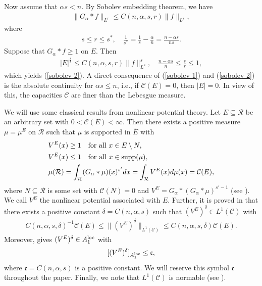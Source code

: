 \documentclass[10pt,reqno]{amsart}
\numberwithin{equation}{section}
\begin{document}
Now assume that $\alpha s<n$. By Sobolev embedding theorem, we have 
\begin{align*}
\|G_{\alpha}\ast f\|_{L^{r}}\leq C(n,\alpha,s,r)\|f\|_{L^{s}},
\end{align*}
where
\begin{align*}
s\leq r\leq s^{\ast},\quad\frac{1}{s^{\ast}}=\frac{1}{s}-\frac{\alpha}{n}=\frac{n-\alpha s}{ns}.
\end{align*}
Suppose that $G_{\alpha}\ast f\geq 1$ on $E$. Then
\begin{align*}
|E|^{\frac{s}{r}}\leq C(n,\alpha,s,r)\|f\|_{L^{s}}^{s},\quad\frac{n-\alpha s}{n}\leq\frac{s}{r}\leq 1,
\end{align*}
which yields (\ref{sobolev 2}). A direct consequence of (\ref{sobolev 1}) and (\ref{sobolev 2}) is the absolute continuity for $\alpha s\leq n$, i.e., if $\mathcal{C}(E)=0$, then $|E|=0$. In view of this, the capacities $\mathcal{C}$ are finer than the Lebesgue measure.

We will use some classical results from nonlinear potential theory. Let $E\subseteq\mathcal{R}$ be an arbitrary set with $0<\mathcal{C}(E)<\infty$. Then there exists a positive measure $\mu=\mu^{E}$ on $\mathcal{R}$ such that $\mu$ is supported in $\overline{E}$ with 
\begin{align*}
&V^{E}(x)\geq 1\quad\text{for all }x\in E\setminus N,\\
&V^{E}(x)\leq 1\quad\text{for all }x\in{\rm supp}(\mu),\\
&\mu(\mathcal{R})=\int_{\mathcal{R}}(G_{\alpha}\ast\mu)(x)^{s'}dx=\int_{\mathcal{R}}V^{E}(x)d\mu(x)=\mathcal{C}(E),
\end{align*}
where $N\subseteq\mathcal{R}$ is some set with $\mathcal{C}(N)=0$ and $V^{E}=G_{\alpha}\ast(G_{\alpha}\ast\mu)^{s'-1}$ (see \cite[Theorem 2.5.6]{AH}). We call $V^{E}$ the nonlinear potential associated with $E$. Further, it is proved in \cite[Lemma 3.2]{OP} that there exists a positive constant $\delta=C(n,\alpha,s)$ such that $(V^{E})^{\delta}\in L^{1}(\mathcal{C})$ with 
\begin{align*}
C(n,\alpha,s,\delta)^{-1}\mathcal{C}(E)\leq\|(V^{E})^{\delta}\|_{L^{1}(\mathcal{C})}\leq C(n,\alpha,s,\delta)\mathcal{C}(E).
\end{align*}
Moreover, \cite[Theorem 3.1]{OP} gives $(V^{E})^{\delta}\in A_{1}^{\rm loc}$ with 
\begin{align}\label{universal}
[(V^{E})^{\delta}]_{A_{1}^{\rm loc}}\leq\mathfrak{c},
\end{align}
where $\mathfrak{c}=C(n,\alpha,s)$ is a positive constant. We will reserve this symbol $\mathfrak{c}$ throughout the paper. Finally, we note that $L^{1}(\mathcal{C})$ is normable (see \cite[Theorem 2.8]{OK2}).
\end{document}
